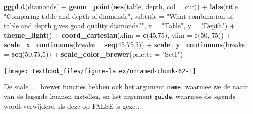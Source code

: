 \documentclass[]{tufte-book}
\newenvironment{Shaded}{}{}
\newcommand{\DataTypeTok}[1]{\textcolor[rgb]{0.56,0.13,0.00}{#1}}
\newcommand{\DecValTok}[1]{\textcolor[rgb]{0.25,0.63,0.44}{#1}}
\newcommand{\KeywordTok}[1]{\textcolor[rgb]{0.00,0.44,0.13}{\textbf{#1}}}
\newcommand{\NormalTok}[1]{#1}
\newcommand{\OperatorTok}[1]{\textcolor[rgb]{0.40,0.40,0.40}{#1}}
\newcommand{\StringTok}[1]{\textcolor[rgb]{0.25,0.44,0.63}{#1}}
\begin{document}
\begin{Shaded}
\begin{Highlighting}[]
\KeywordTok{ggplot}\NormalTok{(diamonds) }\OperatorTok{+}
\StringTok{    }\KeywordTok{geom_point}\NormalTok{(}\KeywordTok{aes}\NormalTok{(table, depth, }\DataTypeTok{col =}\NormalTok{ cut)) }\OperatorTok{+}\StringTok{ }
\StringTok{    }\KeywordTok{labs}\NormalTok{(}\DataTypeTok{title =} \StringTok{"Comparing table and depth of diamonds"}\NormalTok{,}
         \DataTypeTok{subtitle =} \StringTok{"What combination of table and depth gives good quality diamonds?"}\NormalTok{,}
         \DataTypeTok{x =} \StringTok{"Table"}\NormalTok{,}
         \DataTypeTok{y =} \StringTok{"Depth"}\NormalTok{) }\OperatorTok{+}
\StringTok{    }\KeywordTok{theme_light}\NormalTok{() }\OperatorTok{+}
\StringTok{    }\KeywordTok{coord_cartesian}\NormalTok{(}\DataTypeTok{xlim =} \KeywordTok{c}\NormalTok{(}\DecValTok{45}\NormalTok{,}\DecValTok{75}\NormalTok{), }\DataTypeTok{ylim =} \KeywordTok{c}\NormalTok{(}\DecValTok{50}\NormalTok{, }\DecValTok{75}\NormalTok{)) }\OperatorTok{+}
\StringTok{    }\KeywordTok{scale_x_continuous}\NormalTok{(}\DataTypeTok{breaks =} \KeywordTok{seq}\NormalTok{(}\DecValTok{45}\NormalTok{,}\DecValTok{75}\NormalTok{,}\DecValTok{5}\NormalTok{)) }\OperatorTok{+}
\StringTok{    }\KeywordTok{scale_y_continuous}\NormalTok{(}\DataTypeTok{breaks =} \KeywordTok{seq}\NormalTok{(}\DecValTok{50}\NormalTok{,}\DecValTok{75}\NormalTok{,}\DecValTok{5}\NormalTok{)) }\OperatorTok{+}
\StringTok{    }\KeywordTok{scale_color_brewer}\NormalTok{(}\DataTypeTok{palette =} \StringTok{"Set1"}\NormalTok{)}
\end{Highlighting}
\end{Shaded}

\texttt{[image: textbook\_files/figure-latex/unnamed-chunk-62-1]}

De scale\_.\_brewer functies hebben ook het argument \texttt{name}, waarmee we de naam van de legende kunnen instellen, en het argument \texttt{guide}, waarmee de legende wordt verwijderd als deze op FALSE is gezet.
\end{document}
